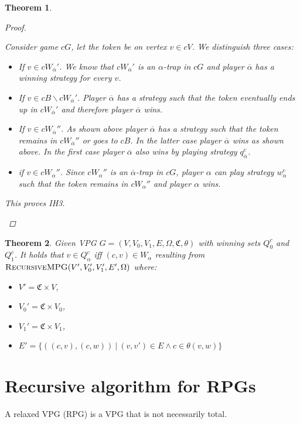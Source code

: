 \documentclass[]{article}
\newtheorem{theorem}{Theorem}[section]
\begin{document}
\begin{theorem}
\begin{proof}
\begin{itemize}
			Consider game $cG$, let the token be on vertex $v \in cV$. We distinguish three cases:
			\begin{itemize}
				\item If $v \in cW_{\overline{\alpha}}'$. We know that $cW_{\overline{\alpha}}'$ is an $\alpha$-trap in $cG$ and player $\overline{\alpha}$ has a winning strategy for every $v$.
				\item If $v \in cB \backslash cW_{\overline{\alpha}}'$. Player $\overline{\alpha}$ has a strategy such that the token eventually ends up in $cW_{\overline{\alpha}}'$ and therefore player $\overline{\alpha}$ wins.
				\item If $v \in cW_{\overline{\alpha}}''$. As shown above player $\overline{\alpha}$ has a strategy such that the token remains in $cW_{\overline{\alpha}}''$ or goes to $cB$. In the latter case player $\overline{\alpha}$ wins as shown above. In the first case player $\overline{\alpha}$ also wins by playing strategy $q_{\overline{\alpha}}^c$.
				\item if $v \in cW_\alpha''$. Since $cW_\alpha''$ is an $\overline{\alpha}$-trap in $cG$, player $\alpha$ can play strategy $w_\alpha^c$ such that the token remains in $cW_\alpha''$ and player $\alpha$ wins.
			\end{itemize}
		This proves IH3.
		\end{itemize}
	
	\end{proof}
\end{theorem}
\begin{theorem}
	Given VPG $G = (V,V_0,V_1,E,\Omega,\mathfrak{C},\theta)$ with winning sets $Q_0^c$ and $Q_1^c$. It holds that $v \in Q_\alpha^c$ iff $(c,v) \in W_\alpha$ resulting from $\textsc{RecursiveMPG}(V',V_0',V_1',E',\Omega)$ where:
	\begin{itemize}
		\item $V' = \mathfrak{C} \times V$,
		\item $V_0' = \mathfrak{C} \times V_0$,
		\item $V_1' = \mathfrak{C} \times V_1$,
		\item $E' = \{ ((c,v),(c,w))\ |\ (v,v') \in E \wedge c \in\theta(v,w) \}$
	\end{itemize}
\end{theorem}
\pagebreak
\section{Recursive algorithm for RPGs}
	A relaxed VPG (RPG) is a VPG that is not necessarily total.
	
\end{document}
